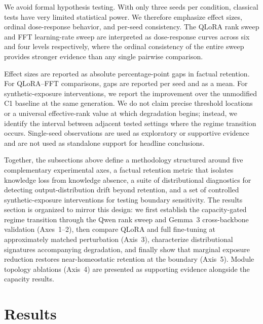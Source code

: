 \documentclass[a4paper,fleqn]{cas-dc}
\begin{document}
We avoid formal hypothesis testing. With only three seeds per condition,
classical tests have very limited statistical power. We therefore emphasize
effect sizes, ordinal dose-response behavior, and per-seed consistency. The
QLoRA rank sweep and FFT learning-rate sweep are interpreted as dose-response
curves across six and four levels respectively, where the ordinal consistency of
the entire sweep provides stronger evidence than any single pairwise comparison.

Effect sizes are reported as absolute percentage-point gaps in factual retention.
For QLoRA--FFT comparisons, gaps are reported per seed and as a mean. For
synthetic-exposure interventions, we report the improvement over the unmodified
C1 baseline at the same generation. We do not claim precise threshold locations
or a universal effective-rank value at which degradation begins; instead, we
identify the interval between adjacent tested settings where the regime
transition occurs. Single-seed observations are used as exploratory or
supportive evidence and are not used as standalone support for headline
conclusions.

Together, the subsections above define a methodology structured around five
complementary experimental axes, a factual retention metric that isolates
knowledge loss from knowledge absence, a suite of distributional diagnostics for
detecting output-distribution drift beyond retention, and a set of controlled
synthetic-exposure interventions for testing boundary sensitivity. The results
section is organized to mirror this design: we first establish the
capacity-gated regime transition through the Qwen rank sweep and Gemma~3
cross-backbone validation (Axes~1--2), then compare QLoRA and full fine-tuning
at approximately matched perturbation (Axis~3), characterize distributional
signatures accompanying degradation, and finally show that marginal exposure
reduction restores near-homeostatic retention at the boundary (Axis~5). Module
topology ablations (Axis~4) are presented as supporting evidence alongside the
capacity results.

\section{Results}\label{sec:results}
\end{document}
